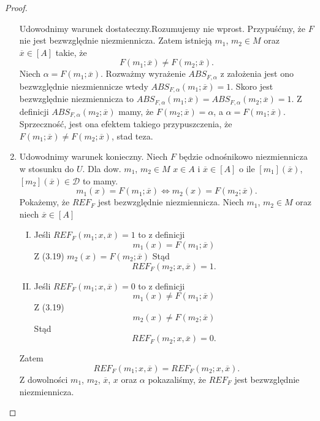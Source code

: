 \documentclass[12pt,a4paper]{report}
\newcommand{\domkniecie}[1]{\left[ {#1} \right] }
\begin{document}
\begin{proof}
\begin{enumerate}
Udowodnimy warunek dostateczny.Rozumujemy nie wprost. Przypuśćmy, że $F$ nie jest bezwzględnie niezmiennicza. Zatem istnieją $m_1$, $m_2 \in M$ oraz $\overline{x} \in \domkniecie{A}$ takie, że
$$
F(m_1;\overline{x})\ne F(m_2;\overline{x}).
$$
Niech $\alpha=F(m_1;\overline{x})$. Rozważmy wyrażenie $ABS_{F,\alpha}$  z założenia jest ono bezwzględnie niezmiennicze wtedy $ABS_{F,\alpha}(m_1;\overline{x})=1$. Skoro jest bezwzględnie niezmiennicza  to $ABS_{F,\alpha}(m_1;\overline{x})=ABS_{F,\alpha}(m_2;\overline{x})=1$. Z definicji $ABS_{F,\alpha}(m_2;\overline{x})$ mamy, że $F(m_2;\overline{x})=\alpha$, a $\alpha=F(m_1;\overline{x})$. Sprzeczność, jest ona efektem takiego przypuszczenia, że $F(m_1;\overline{x})\ne F(m_2;\overline{x})$, stad teza.
\item
Udowodnimy warunek konieczny. Niech $F$ będzie odnośnikowo niezmiennicza w stosunku do $U$. Dla dow. $m_{1}$, $m_{2} \in M$ $x \in A$ i  $\overline{x} \in \domkniecie{A}$ o ile  $\domkniecie{m_1}(\overline{x})$, $\domkniecie{m_2}(\overline{x})\in \mathcal{D}$ to mamy.
\begin{equation}
 m_{1}(x)=F(m_{1};\overline{x}) \iff m_{2}(x)=F(m_{2};\overline{x}).
\end{equation}
Pokażemy, że $REF_{F}$ jest bezwzględnie niezmiennicza. Niech $m_1$, $m_2 \in M$ oraz niech $\overline{x} \in \domkniecie{A}$ 
\begin{enumerate}[I.]
\item
Jeśli $REF_{F}(m_1;x,\overline{x})=1$ to z definicji
$$
m_1(x)=F(m_1;\overline{x})
$$
Z (3.19) $m_2(x)=F(m_2;\overline{x})$
Stąd 
$$
REF_{F}(m_2;x,\overline{x})=1.
$$
\item
Jeśli $REF_{F}(m_1;x,\overline{x})=0$ to z definicji 
$$
m_1(x)\ne F(m_1;\overline{x})
$$
Z (3.19)
$$
m_2(x)\ne F(m_2;\overline{x})
$$
Stąd
$$
REF_{F}(m_2;x,\overline{x})=0.
$$
\end{enumerate}
Zatem 
$$
REF_{F}(m_1;x,\overline{x})=REF_{F}(m_2;x,\overline{x}).
$$
Z dowolności $m_1$, $m_2$, $\overline{x}$, $x$ oraz $\alpha$ pokazaliśmy, że $REF_{F}$ jest bezwzględnie niezmiennicza.


\end{enumerate}
\end{proof}
\end{document}
